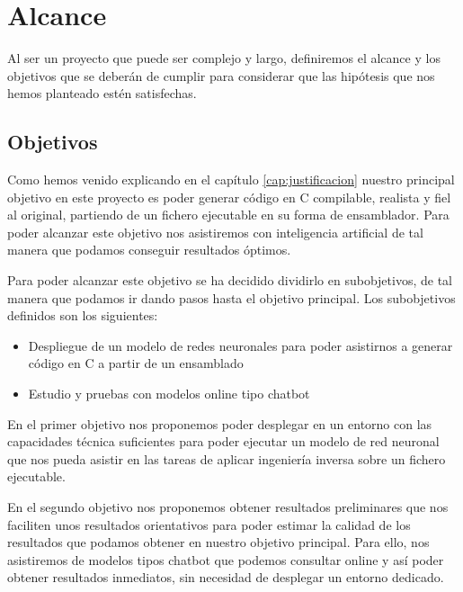 \chapter{Alcance}
\label{cap:alcance}


Al ser un proyecto que puede ser complejo y largo, definiremos el alcance y los objetivos que se deberán de cumplir para considerar que las hipótesis que nos
hemos planteado estén satisfechas.

\section{Objetivos}
\label{sec:objetivos}


Como hemos venido explicando en el capítulo \ref{cap:justificacion} nuestro principal objetivo en este proyecto es poder generar código en C compilable, realista y fiel
al original, partiendo de un fichero ejecutable en su forma de ensamblador. Para poder alcanzar este objetivo nos asistiremos con inteligencia artificial de tal manera
que podamos conseguir resultados óptimos.

Para poder alcanzar este objetivo se ha decidido dividirlo en subobjetivos, de tal manera que podamos ir dando pasos hasta el objetivo principal.
Los subobjetivos definidos son los siguientes:

\begin{itemize}
    \item Despliegue de un modelo de redes neuronales para poder asistirnos a generar código en C a partir de un ensamblado
    \item Estudio y pruebas con modelos online tipo chatbot
\end{itemize}

En el primer objetivo nos proponemos poder desplegar en un entorno con las capacidades técnica suficientes para poder ejecutar un modelo de red neuronal que nos
pueda asistir en las tareas de aplicar ingeniería inversa sobre un fichero ejecutable.

En el segundo objetivo nos proponemos obtener resultados preliminares que nos faciliten unos resultados orientativos para poder estimar la calidad de los resultados que podamos
obtener en nuestro objetivo principal. Para ello, nos asistiremos de modelos tipos chatbot que podemos consultar online y así poder obtener resultados inmediatos, sin necesidad
de desplegar un entorno dedicado.


